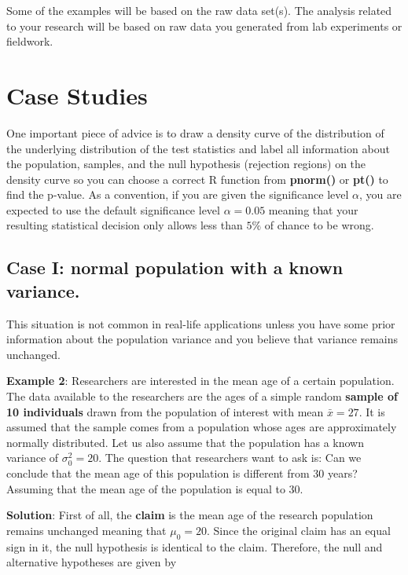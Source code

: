 \documentclass[
]{book}
\begin{document}
Some of the examples will be based on the raw data set(s). The analysis related to your research will be based on raw data you generated from lab experiments or fieldwork.

\hypertarget{case-studies}{%
\section{Case Studies}\label{case-studies}}

One important piece of advice is to draw a density curve of the distribution of the underlying distribution of the test statistics and label all information about the population, samples, and the null hypothesis (rejection regions) on the density curve so you can choose a correct R function from \textbf{pnorm()} or \textbf{pt()} to find the p-value. As a convention, if you are given the significance level \(\alpha\), you are expected to use the default significance level \(\alpha = 0.05\) meaning that your resulting statistical decision only allows less than \(5\%\) of chance to be wrong.

\hypertarget{case-i-normal-population-with-a-known-variance.}{%
\subsection{Case I: normal population with a known variance.}\label{case-i-normal-population-with-a-known-variance.}}

This situation is not common in real-life applications unless you have some prior information about the population variance and you believe that variance remains unchanged.

\textbf{Example 2}: Researchers are interested in the mean age of a certain population. The data available to the researchers are the ages of a simple random \textbf{sample of 10 individuals} drawn from the population of interest with mean \(\bar{x} = 27\). It is assumed that the sample comes from a population whose ages are approximately normally distributed. Let us also assume that the population has a known variance of \(\sigma_0^2 = 20\). The question that researchers want to ask is: Can we conclude that the mean age of this population is different from 30 years? Assuming that the mean age of the population is equal to 30.

\textbf{Solution}: First of all, the \textbf{claim} is the mean age of the research population remains unchanged meaning that \(\mu_0=20\). Since the original claim has an equal sign in it, the null hypothesis is identical to the claim. Therefore, the null and alternative hypotheses are given by
\end{document}
